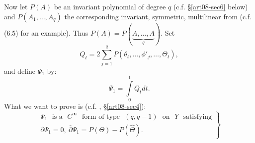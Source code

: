 Now let $P(A)$ be an invariant polynomial of degree $q$ (c.f. \S\ref{art08-sec6} below) and $P(A_{1},\ldots,A_{q})$ the corresponding invariant, symmetric, multilinear from (c.f. (6.5) for an example). Thus $P(A)=P(\underbrace{A,\ldots,A}_{q})$. Set
\begin{equation*}
Q_{t}=2\sum\limits^{q}_{j=1}P(\theta_{t},\ldots,\phi'_{j},\ldots,\Theta_{t}),\tag{A4.9}\label{art08-sec4-eqA4.9}
\end{equation*}
and define $\Psi_{1}$ by:
\begin{equation*}
\Psi_{1}=\int\limits^{1}_{0}Q_{t}dt.\tag{A4.10}\label{art08-sec4-eqA4.10}
\end{equation*}
What we want to prove is (c.f. \cite{art08-key11}, \S\ref{art08-sec4}):
\begin{equation*}
\left.
\begin{array}{l}
\Psi_{1}\text{~ is a~ } C^{\infty}\text{~ form of type~ } (q,q-1)\text{~ on~ } Y\text{~ satisfying}\\[4pt]
\partial\Psi_{1}=0, \ \overline{\partial}\Psi_{1}=P(\Theta)-P(\widehat{\Theta}).
\end{array}
\right\}\tag{A4.11}\label{art08-sec4-eqA4.11}
\end{equation*}

